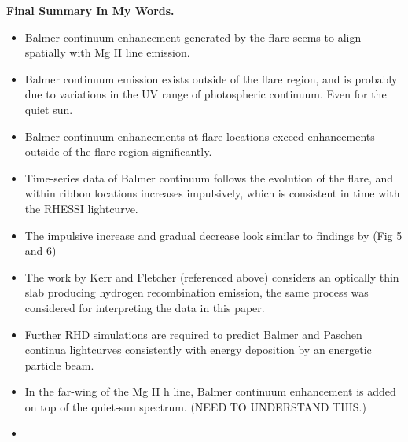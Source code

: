 \documentclass[11pt]{article}
\begin{document}
\textbf{Final Summary In My Words.}
\begin{itemize}
\item Balmer continuum enhancement generated by the flare seems to align spatially with Mg II line emission.
\item Balmer continuum emission exists outside of the flare region, and is probably due to variations in the UV range of photospheric continuum. Even for the quiet sun.
\item Balmer continuum enhancements at flare locations exceed enhancements outside of the flare region significantly.
\item Time-series data of Balmer continuum follows the evolution of the flare, and within ribbon locations increases impulsively, which is consistent in time with the RHESSI lightcurve.
\item The impulsive increase and gradual decrease look similar to findings by \cite{2014ApJ...783...98K} (Fig 5 and 6)
\item The work by Kerr and Fletcher (referenced above) considers an optically thin slab producing hydrogen recombination emission, the same process was considered for interpreting the data in this paper.
\item Further RHD simulations are required to predict Balmer and Paschen continua lightcurves consistently with energy deposition by an energetic particle beam.
\item In the far-wing of the Mg II h line, Balmer continuum enhancement is added on top of the quiet-sun spectrum. (NEED TO UNDERSTAND THIS.)
\item    
\end{itemize}

\label{Bibliography}
%
\end{document}
